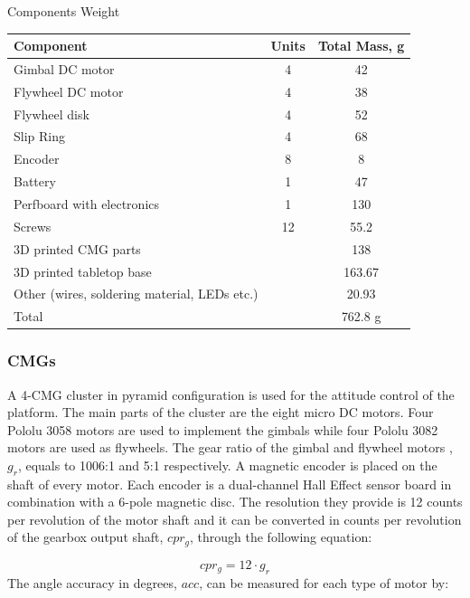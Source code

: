 \documentclass[aerospace,article,submit,moreauthors,dvi2pdf]{Definitions/mdpi}
\begin{document}
\begin{specialtable}[H] 
\caption{\label{table:componentsweight} Components Weight}
\begin{tabular}{lcc}
\toprule
\textbf{Component}  & \textbf{Units} & \textbf{Total Mass, g}   \\
\midrule
Gimbal DC motor &   4 &  42\\
Flywheel DC motor& 4 & 38\\
Flywheel disk & 4 & 52\\
Slip Ring     & 4 & 68\\
Encoder       & 8 &  8   \\
Battery        & 1 & 47\\
Perfboard with electronics  &1& 130 \\
Screws &12 & 55.2  \\
3D printed CMG parts &&138  \\
3D printed tabletop base && 163.67\\ %
Other (wires, soldering material, LEDs etc.) && 20.93\\
Total            & & 762.8 g  \\
\bottomrule
\end{tabular}
\end{specialtable}


\subsubsection{CMGs}
A 4-CMG cluster in pyramid configuration is used for the attitude control of the platform. The main parts of the cluster are the eight micro DC motors. Four Pololu 3058 motors are used to implement the gimbals while four Pololu 3082 motors are used as flywheels. The gear ratio of the gimbal and flywheel motors , $g_r$, equals to 1006:1 and 5:1 respectively. A magnetic encoder is placed on the shaft of every motor. Each encoder is a dual-channel Hall Effect sensor board in combination with a 6-pole magnetic disc. The resolution they provide is 12 counts per revolution of the motor shaft and it can be converted in counts per revolution of the gearbox output shaft, $cpr_g$, through the following equation: 

\begin{equation}
cpr_{g}=12\cdot g_r
\end{equation}
The angle accuracy in degrees, $acc$, can be measured for each type of motor by:
\end{document}
